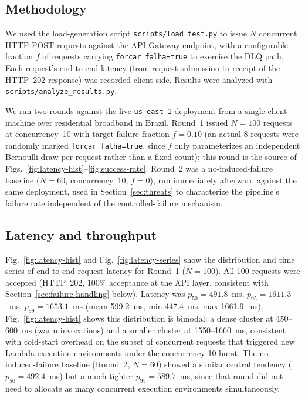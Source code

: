 \documentclass[conference]{IEEEtran}
\begin{document}
\subsection{Methodology}
We used the load-generation script \texttt{scripts/load\_test.py} to issue $N$ concurrent HTTP POST requests against the API Gateway endpoint, with a configurable fraction $f$ of requests carrying \texttt{forcar\_falha=true} to exercise the DLQ path. Each request's end-to-end latency (from request submission to receipt of the HTTP~202 response) was recorded client-side. Results were analyzed with \texttt{scripts/analyze\_results.py}.

We ran two rounds against the live \texttt{us-east-1} deployment from a single client machine over residential broadband in Brazil. Round~1 issued $N=100$ requests at concurrency~10 with target failure fraction $f=0.10$ (an actual 8 requests were randomly marked \texttt{forcar\_falha=true}, since $f$ only parameterizes an independent Bernoulli draw per request rather than a fixed count); this round is the source of Figs.~\ref{fig:latency-hist}--\ref{fig:success-rate}. Round~2 was a no-induced-failure baseline ($N=60$, concurrency~10, $f=0$), run immediately afterward against the same deployment, used in Section~\ref{sec:threats} to characterize the pipeline's failure rate independent of the controlled-failure mechanism.

\subsection{Latency and throughput}
Fig.~\ref{fig:latency-hist} and Fig.~\ref{fig:latency-series} show the distribution and time series of end-to-end request latency for Round~1 ($N=100$). All 100 requests were accepted (HTTP~202, 100\% acceptance at the API layer, consistent with Section~\ref{sec:failure-handling} below). Latency was $p_{50}=491.8$~ms, $p_{95}=1611.3$~ms, $p_{99}=1653.1$~ms (mean 599.2~ms, min 447.4~ms, max 1661.9~ms). Fig.~\ref{fig:latency-hist} shows this distribution is bimodal: a dense cluster at 450--600~ms (warm invocations) and a smaller cluster at 1550--1660~ms, consistent with cold-start overhead on the subset of concurrent requests that triggered new Lambda execution environments under the concurrency-10 burst. The no-induced-failure baseline (Round~2, $N=60$) showed a similar central tendency ($p_{50}=492.4$~ms) but a much tighter $p_{95}=589.7$~ms, since that round did not need to allocate as many concurrent execution environments simultaneously.
\end{document}
